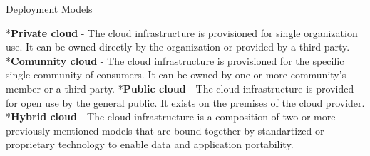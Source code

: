 \seccc Deployment Models

\begitems
	*{\bf Private cloud} - The cloud infrastructure is provisioned for single organization use. It can be owned directly by the organization or provided by a third party.
	*{\bf Comunnity cloud} - The cloud infrastructure is provisioned for the specific single community of consumers. It can be owned by one or more community's member or a third party.
	*{\bf Public cloud} - The cloud infrastructure is provided for open use by the general public. It exists on the premises of the cloud provider.
	*{\bf Hybrid cloud} - The cloud infrastructure is a composition of two or more previously mentioned models that are bound together by standartized or proprietary technology to enable data and application portability.
	
\enditems

